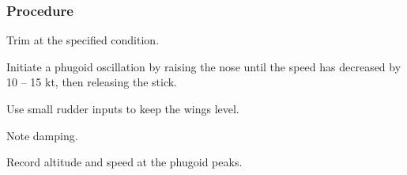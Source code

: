 % 
% 
%
 \subsubsection*{Procedure}
 \begin{compactenum}
    \item Trim at the specified condition.
    \item Initiate a phugoid oscillation by raising the nose until the speed has decreased by 10 -- 15 kt, then releasing the stick.
    \item Use small rudder inputs to keep the wings level.
    \item Note damping.
    \item Record altitude and speed at the phugoid peaks.
    \end{compactenum}
